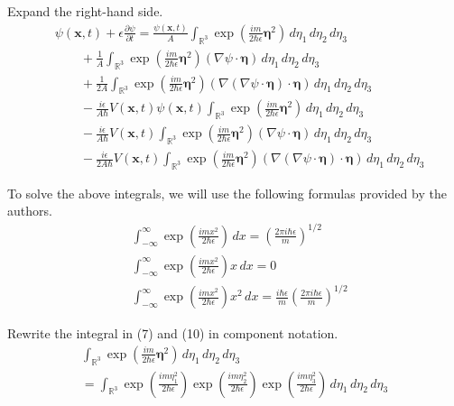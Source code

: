 \documentclass[12pt]{article}
\begin{document}
Expand the right-hand side.
\begin{align*}
&\psi(\mathbf{x},t)+\epsilon\frac{\partial\psi}{\partial t}
=\frac{\psi(\mathbf x,t)}{A}\int_{\mathbb R^3}
\exp\left(\frac{im}{2\hbar\epsilon}\boldsymbol\eta^2\right)
\,d\eta_1\,d\eta_2\,d\eta_3
\tag{7}
\\
&\qquad{}+\frac{1}{A}\int_{\mathbb R^3}
\exp\left(\frac{im}{2\hbar\epsilon}\boldsymbol\eta^2\right)
(\nabla\psi\cdot\boldsymbol\eta)
\,d\eta_1\,d\eta_2\,d\eta_3
\tag{8}
\\
&\qquad{}+\frac{1}{2A}\int_{\mathbb R^3}
\exp\left(\frac{im}{2\hbar\epsilon}\boldsymbol\eta^2\right)
(\nabla(\nabla\psi\cdot\boldsymbol\eta)\cdot\boldsymbol\eta)
\,d\eta_1\,d\eta_2\,d\eta_3
\tag{9}
\\
&\qquad{}-\frac{i\epsilon}{A\hbar}V\left(\mathbf x,t\right)\psi(\mathbf x,t)\int_{\mathbb R^3}
\exp\left(\frac{im}{2\hbar\epsilon}\boldsymbol\eta^2\right)
\,d\eta_1\,d\eta_2\,d\eta_3
\tag{10}
\\
&\qquad{}-\frac{i\epsilon}{A\hbar}V\left(\mathbf x,t\right)\int_{\mathbb R^3}
\exp\left(\frac{im}{2\hbar\epsilon}\boldsymbol\eta^2\right)
(\nabla\psi\cdot\boldsymbol\eta)
\,d\eta_1\,d\eta_2\,d\eta_3
\tag{11}
\\
&\qquad{}-\frac{i\epsilon}{2A\hbar}V\left(\mathbf x,t\right)\int_{\mathbb R^3}
\exp\left(\frac{im}{2\hbar\epsilon}\boldsymbol\eta^2\right)
(\nabla(\nabla\psi\cdot\boldsymbol\eta)\cdot\boldsymbol\eta)
\,d\eta_1\,d\eta_2\,d\eta_3
\tag{12}
\end{align*}

To solve the above integrals, we will use the following formulas provided by the authors.
\begin{align*}
&\int_{-\infty}^\infty\exp\left(\frac{imx^2}{2\hbar\epsilon}\right)\,dx
=\left(\frac{2\pi i\hbar\epsilon}{m}\right)^{1/2}
\tag{13}
\\
&\int_{-\infty}^\infty\exp\left(\frac{imx^2}{2\hbar\epsilon}\right)x\,dx
=0
\tag{14}
\\
&\int_{-\infty}^\infty\exp\left(\frac{imx^2}{2\hbar\epsilon}\right)x^2\,dx
=\frac{i\hbar\epsilon}{m}\left(\frac{2\pi i\hbar\epsilon}{m}\right)^{1/2}
\tag{15}
\end{align*}

Rewrite the integral in (7) and (10) in component notation.
\begin{multline*}
\int_{\mathbb R^3}
\exp\left(\frac{im}{2\hbar\epsilon}\boldsymbol\eta^2\right)
\,d\eta_1\,d\eta_2\,d\eta_3
\\
{}=\int_{\mathbb R^3}
\exp\left(\frac{im\eta_1^2}{2\hbar\epsilon}\right)
\exp\left(\frac{im\eta_2^2}{2\hbar\epsilon}\right)
\exp\left(\frac{im\eta_3^2}{2\hbar\epsilon}\right)
\,d\eta_1\,d\eta_2\,d\eta_3
\end{multline*}
\end{document}
